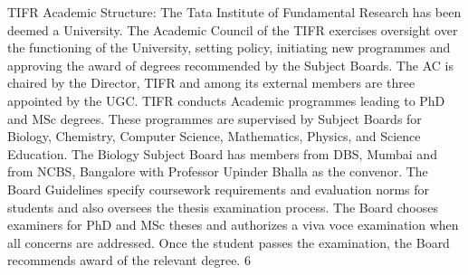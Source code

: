 \documentclass[a4paper,10pt]{article}
\begin{document}
TIFR Academic Structure: The Tata Institute of Fundamental Research has been deemed a University. The
Academic Council of the TIFR exercises oversight over the functioning of the University, setting policy, initiating
new programmes and approving the award of degrees recommended by the Subject Boards. The AC is chaired
by the Director, TIFR and among its external members are three appointed by the UGC. TIFR conducts
Academic programmes leading to PhD and MSc degrees. These programmes are supervised by Subject
Boards for Biology, Chemistry, Computer Science, Mathematics, Physics, and Science Education. The Biology
Subject Board has members from DBS, Mumbai and from NCBS, Bangalore with Professor Upinder Bhalla as
the convenor. The Board Guidelines specify coursework requirements and evaluation norms for students and
also oversees the thesis examination process. The Board chooses examiners for PhD and MSc theses and
authorizes a viva voce examination when all concerns are addressed. Once the student passes the
examination, the Board recommends award of the relevant degree.
6	
  
	
  
\end{document}
